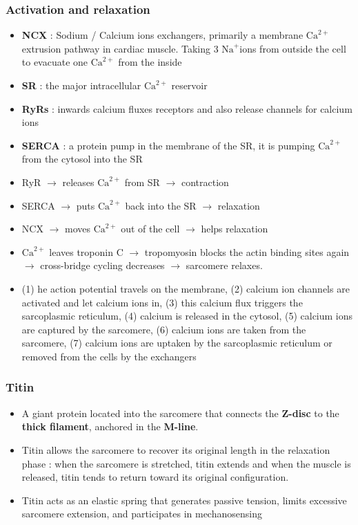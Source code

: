 \documentclass{article}
\begin{document}
\subsubsection{Activation and relaxation}
\begin{itemize}
    \item \textbf{NCX} : Sodium / Calcium ions exchangers, primarily a membrane $\text{Ca}^{2+}$ extrusion pathway in cardiac muscle. Taking 3 $\text{Na}^{+}$ions from outside the cell to evacuate one $\text{Ca}^{2+}$ from the inside 
    \item  \textbf{SR} : the major intracellular $\text{Ca}^{2+}$ reservoir
    \item \textbf{RyRs} :  inwards calcium fluxes receptors and also release channels for calcium ions
    \item \textbf{SERCA} : a protein pump in the membrane of the SR, it is pumping $\text{Ca}^{2+}$ from the cytosol into the SR
    \item RyR $\rightarrow$ releases $\text{Ca}^{2+}$ from SR $\rightarrow$ contraction
    \item SERCA $\rightarrow$ puts $\text{Ca}^{2+}$ back into the SR $\rightarrow$ relaxation
    \item NCX $\rightarrow$ moves $\text{Ca}^{2+}$ out of the cell $\rightarrow$ helps relaxation
    \item  $\text{Ca}^{2+}$ leaves troponin C $\rightarrow$ tropomyosin blocks the actin binding sites again $\rightarrow$ cross-bridge cycling decreases $\rightarrow$ sarcomere relaxes.
    \item (1) he action potential travels on the membrane, (2) calcium ion channels are activated and let calcium ions in, (3) this calcium flux triggers the sarcoplasmic reticulum, (4) calcium is released in the cytosol, (5) calcium ions are captured by the sarcomere, (6) calcium ions are taken from the sarcomere, (7) calcium ions are uptaken by the sarcoplasmic reticulum or removed from the cells by the exchangers
\end{itemize}

\subsubsection{Titin}
\begin{itemize}
    \item A giant protein located into the sarcomere that connects the \textbf{Z-disc} to the \textbf{thick filament}, anchored in the \textbf{M-line}.
    \item Titin allows the sarcomere to recover its original length in the relaxation phase : when the sarcomere is stretched, titin extends and when the muscle is released, titin tends to return toward its original configuration.
    \item Titin acts as an elastic spring that generates passive tension, limits excessive sarcomere extension, and participates in mechanosensing
\end{itemize}
\end{document}
